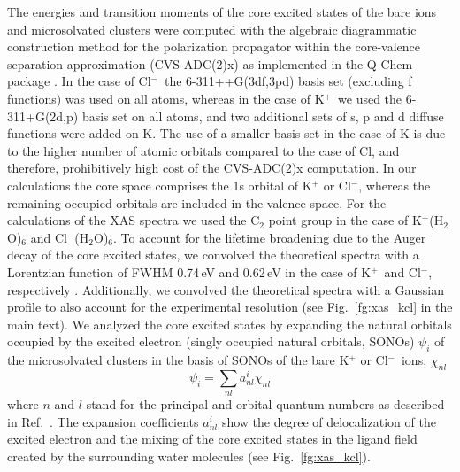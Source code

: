 \documentclass[journal=jpclcd,manuscript=letter]{achemso}
\begin{document}
The energies and transition moments of the core excited states of the bare ions and microsolvated clusters were computed with the algebraic diagrammatic construction method for the polarization propagator \citep{sch82:2395} within the core-valence separation approximation \citep{bar85:867,ced80:206,ced81:1038} (CVS-ADC(2)x) as implemented in the Q-Chem package \citep{Wenzel14:1900,Wenzel14:4583,Wormit14:774,QChem2015}. In the case of Cl$^{-}$~the 6-311++G(3df,3pd) basis set \citep{Krishnan80:650,McLean80:5639} (excluding f functions) was used on all atoms, whereas in the case of K$^{+}$~we used the 6-311+G(2d,p) basis set \citep{Krishnan80:650,Blaudeau97:5016} on all atoms, and two additional sets of s, p and d diffuse functions were added on K. The use of a smaller basis set in the case of K is due to the higher number of atomic orbitals compared to the case of Cl, and therefore, prohibitively high cost of the CVS-ADC(2)x computation. In our calculations the core space comprises the 1s orbital of K$^{+}$ or Cl$^{-}$, whereas the remaining occupied orbitals are included in the valence space. For the calculations of the XAS spectra we used the C$_2$ point group in the case of K$^{+}$(H$_2$O)$_6$ and Cl$^{-}$(H$_2$O)$_6$. To account for the lifetime broadening due to the Auger decay of the core excited states, we convolved the theoretical spectra with a Lorentzian function of FWHM 0.74\,eV and 0.62\,eV in the case of K$^{+}$~and Cl$^{-}$, respectively \citep{Krause79:329}. Additionally, we convolved the theoretical spectra with a Gaussian profile to also account for the experimental resolution (see Fig.\ \ref{fg:xas_kcl} in the main text). We analyzed the core excited states by expanding the natural orbitals occupied by the excited electron (singly occupied natural orbitals, SONOs) $\psi_{i}$ of the microsolvated clusters in the basis of SONOs of the bare K$^{+}$ or Cl$^{-}$~ions, $\chi_{nl}$
%
\begin{equation}
\psi_{i} = \sum_{nl} a^{i}_{nl} \chi_{nl}
\end{equation}
%
where $n$ and $l$ stand for the principal and orbital quantum numbers as described in Ref.\ \citep{miteva16:16671}. The expansion coefficients $a^{i}_{nl}$ show the degree of delocalization of the excited electron and the mixing of the core excited states in the ligand field created by the surrounding water molecules (see Fig.\ \ref{fg:xas_kcl}).
\end{document}
